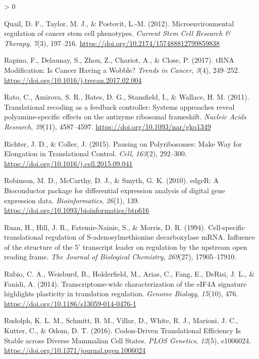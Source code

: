 \documentclass[
  12pt,
  openany]{book}
\newlength{\cslhangindent}
\newenvironment{CSLReferences}[2] %
 {%
  \setlength{\parindent}{0pt}
  \ifodd #1 \everypar{\setlength{\hangindent}{\cslhangindent}}\ignorespaces\fi
  \ifnum #2 > 0
  \setlength{\parskip}{#2\baselineskip}
  \fi
 }%
 {}
\begin{document}
\begin{CSLReferences}{1}{0}
\leavevmode\hypertarget{ref-Quail2012}{}%
Quail, D. F., Taylor, M. J., \& Postovit, L.-M. (2012). Microenvironmental regulation of cancer stem cell phenotypes. \emph{Current Stem Cell Research \& Therapy}, \emph{7}(3), 197--216. \url{https://doi.org/10.2174/157488812799859838}

\leavevmode\hypertarget{ref-Rapino2017}{}%
Rapino, F., Delaunay, S., Zhou, Z., Chariot, A., \& Close, P. (2017). {tRNA Modification}: {Is Cancer Having} a {Wobble}? \emph{Trends in Cancer}, \emph{3}(4), 249--252. \url{https://doi.org/10.1016/j.trecan.2017.02.004}

\leavevmode\hypertarget{ref-Rato2011}{}%
Rato, C., Amirova, S. R., Bates, D. G., Stansfield, I., \& Wallace, H. M. (2011). Translational recoding as a feedback controller: Systems approaches reveal polyamine-specific effects on the antizyme ribosomal frameshift. \emph{Nucleic Acids Research}, \emph{39}(11), 4587--4597. \url{https://doi.org/10.1093/nar/gkq1349}

\leavevmode\hypertarget{ref-Richter2015}{}%
Richter, J. D., \& Coller, J. (2015). Pausing on {Polyribosomes}: {Make Way} for {Elongation} in {Translational Control}. \emph{Cell}, \emph{163}(2), 292--300. \url{https://doi.org/10.1016/j.cell.2015.09.041}

\leavevmode\hypertarget{ref-Robinson2010}{}%
Robinson, M. D., McCarthy, D. J., \& Smyth, G. K. (2010). {edgeR}: A {Bioconductor} package for differential expression analysis of digital gene expression data. \emph{Bioinformatics}, \emph{26}(1), 139. \url{https://doi.org/10.1093/bioinformatics/btp616}

\leavevmode\hypertarget{ref-Ruan1994}{}%
Ruan, H., Hill, J. R., Fatemie-Nainie, S., \& Morris, D. R. (1994). Cell-specific translational regulation of {S}-adenosylmethionine decarboxylase {mRNA}. {Influence} of the structure of the 5' transcript leader on regulation by the upstream open reading frame. \emph{The Journal of Biological Chemistry}, \emph{269}(27), 17905--17910.

\leavevmode\hypertarget{ref-Rubio2014}{}%
Rubio, C. A., Weisburd, B., Holderfield, M., Arias, C., Fang, E., DeRisi, J. L., \& Fanidi, A. (2014). Transcriptome-wide characterization of the {eIF4A} signature highlights plasticity in translation regulation. \emph{Genome Biology}, \emph{15}(10), 476. \url{https://doi.org/10.1186/s13059-014-0476-1}

\leavevmode\hypertarget{ref-Rudolph2016}{}%
Rudolph, K. L. M., Schmitt, B. M., Villar, D., White, R. J., Marioni, J. C., Kutter, C., \& Odom, D. T. (2016). Codon-{Driven Translational Efficiency Is Stable} across {Diverse Mammalian Cell States}. \emph{PLOS Genetics}, \emph{12}(5), e1006024. \url{https://doi.org/10.1371/journal.pgen.1006024}


\end{CSLReferences}
\end{document}
